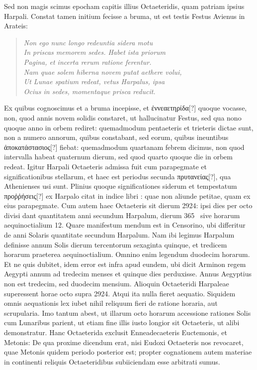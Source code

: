 Sed non magis scimus epocham capitis illius Octaeteridis,
quam patriam ipsius Harpali.
Constat tamen initium fecisse a bruma,
ut est testis Festus Avienus in Arateis:
\begin{quote}
\emph{Non ego nunc longo redeuntia sidera motu\\
In priscas memorem sedes. Habet ista priorum\\
Pagina, et incerta rerum ratione ferentur.\\
Nam quae solem hiberna novem putat aethere volui,\\
Ut Lunae spatium redeat, vetus Harpalus, ipsa\\
Ocius in sedes, momentaque prisca reducit.}
\end{quote}
Ex quibus cognoscimus et a bruma incepisse,
 et \textgreek{ἐννεαετηρίδα[?]} quoque
vocasse, non, quod annis novem solidis constaret, ut hallucinatur
Festus, sed qua nono quoque anno in orbem rediret: quemadmodum
pentaeteris et trieteris dictae sunt, non a numero annorum, quibus
constabant, sed eorum, quibus ineuntibus \textgreek{ἀποκατάστασιος[?]} fiebat:
quemadmodum quartanam febrem dicimus, non quod intervalla habeat
quaternum dierum, sed quod quarto quoque die in orbem redeat.
Igitur Harpali Octaeteris admissa fuit cum parapegmate
 et significationibus
stellarum, et haec est periodus secunda \textgreek{πρυτανείας[?]},
 qua Athenienses
usi sunt.
Plinius quoque significationes siderum et tempestatum
\textgreek{προῤῥήσεις[?]} ex Harpalo citat in indice libri :
 quae non aliunde
petitae, quam ex eius parapegmate.
Cum autem haec Octaeteris sit
dierum 2924: ipsi dies per octo divisi dant quantitatem anni secundum
Harpalum, dierum 365~ sive horarum aequinoctialium 12.
Quare manifestum mendum est in Censorino, ubi differitur de anni
Solaris quantitate secundum Harpalum.
Nam ibi legimus Harpalum
definisse annum Solis dierum tercentorum sexaginta quinque,
et tredicem horarum praeterea aequinoctialium.
Omnino enim legendum duodecim horarum.
Et ne quis dubitet, idem error est infra
apud eundem, ubi dicit Arminon regem Aegypti annum ad tredecim
menses et quinque dies perduxisse.
Annus Aegyptius non est tredecim,
sed duodecim mensium.
Alioquin Octaeteridi Harpaleae superessent
horae octo supra 2924.
Atqui ita nulla fieret aequatio.
Siquidem
omnis aequationis lex iubet nihil reliquum fieri de ratione horaria,
aut scrupularia.
Imo tantum abest, ut illarum octo horarum accessione
rationes Solis cum Lunaribus parient, ut etiam fine illis iusto
longior sit Octaeteris, ut alibi demonstratur.
Hanc Octaeterida exclusit
Enneadecaeteris Euctemonis, et Metonis: De qua proxime dicendum
erat, nisi Eudoxi Octaeteris nos revocaret, quae Metonis quidem
periodo posterior est; propter cognationem autem materiae in
continenti reliquis Octaeteridibus subiiciendam esse arbitrati sumus.

